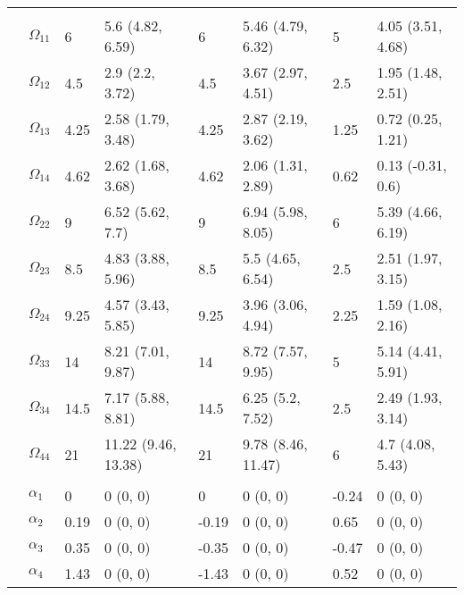 \documentclass[]{article}
\begin{document}
\begin{table}[t]
\begin{tabular}{llllllll}
\addlinespace[0.3em]
\multicolumn{8}{l}{\textbf{ }}\\
\hspace{1em} & $\Omega_{11}$ & 6 & 5.6 (4.82, 6.59) & 6 & 5.46 (4.79, 6.32) & 5 & 4.05 (3.51, 4.68)\\
\hspace{1em} & $\Omega_{12}$ & 4.5 & 2.9 (2.2, 3.72) & 4.5 & 3.67 (2.97, 4.51) & 2.5 & 1.95 (1.48, 2.51)\\
\hspace{1em} & $\Omega_{13}$ & 4.25 & 2.58 (1.79, 3.48) & 4.25 & 2.87 (2.19, 3.62) & 1.25 & 0.72 (0.25, 1.21)\\
\hspace{1em} & $\Omega_{14}$ & 4.62 & 2.62 (1.68, 3.68) & 4.62 & 2.06 (1.31, 2.89) & 0.62 & 0.13 (-0.31, 0.6)\\
\hspace{1em} & $\Omega_{22}$ & 9 & 6.52 (5.62, 7.7) & 9 & 6.94 (5.98, 8.05) & 6 & 5.39 (4.66, 6.19)\\
\hspace{1em} & $\Omega_{23}$ & 8.5 & 4.83 (3.88, 5.96) & 8.5 & 5.5 (4.65, 6.54) & 2.5 & 2.51 (1.97, 3.15)\\
\hspace{1em} & $\Omega_{24}$ & 9.25 & 4.57 (3.43, 5.85) & 9.25 & 3.96 (3.06, 4.94) & 2.25 & 1.59 (1.08, 2.16)\\
\hspace{1em} & $\Omega_{33}$ & 14 & 8.21 (7.01, 9.87) & 14 & 8.72 (7.57, 9.95) & 5 & 5.14 (4.41, 5.91)\\
\hspace{1em} & $\Omega_{34}$ & 14.5 & 7.17 (5.88, 8.81) & 14.5 & 6.25 (5.2, 7.52) & 2.5 & 2.49 (1.93, 3.14)\\
\hspace{1em} & $\Omega_{44}$ & 21 & 11.22 (9.46, 13.38) & 21 & 9.78 (8.46, 11.47) & 6 & 4.7 (4.08, 5.43)\\
\addlinespace[0.3em]
\multicolumn{8}{l}{\textbf{ }}\\
\hspace{1em} & $\alpha_{1}$ & 0 & 0 (0, 0) & 0 & 0 (0, 0) & -0.24 & 0 (0, 0)\\
\hspace{1em} & $\alpha_{2}$ & 0.19 & 0 (0, 0) & -0.19 & 0 (0, 0) & 0.65 & 0 (0, 0)\\
\hspace{1em} & $\alpha_{3}$ & 0.35 & 0 (0, 0) & -0.35 & 0 (0, 0) & -0.47 & 0 (0, 0)\\
\hspace{1em} & $\alpha_{4}$ & 1.43 & 0 (0, 0) & -1.43 & 0 (0, 0) & 0.52 & 0 (0, 0)\\

\end{tabular}
\end{table}
\end{document}
